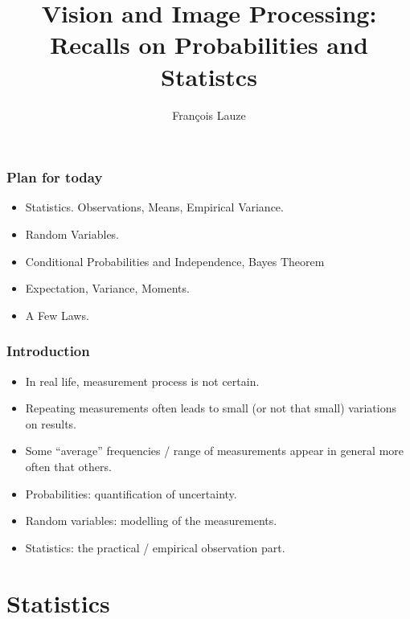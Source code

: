 \documentclass[9pt]{beamer}
\title{Vision and Image Processing:\\ Recalls on Probabilities and Statistcs}
\author[F.~Lauze] %
{Fran{\c c}ois Lauze
}
\institute[DIKU] %
{
  Department of Computer Science\\
  University of Copenhagen
}
\date[2017-18 B2] %
\begin{document}
\maketitle









\begin{frame}
  \frametitle{Plan for today}
  \begin{itemize}
  \item Statistics. Observations, Means, Empirical Variance.
  \item Random Variables.
  \item Conditional Probabilities and Independence, Bayes Theorem
  \item Expectation, Variance, Moments.
  \item A Few Laws.
  \end{itemize}
\end{frame}

\begin{frame}\frametitle{Introduction}
  \begin{itemize}
  \item In real life, measurement process is not certain. 
  \item Repeating measurements often leads to small (or not that small) variations on results.
  \item Some ``average'' frequencies / range of measurements appear in general more often that others.
  \item Probabilities: quantification of uncertainty.
  \item Random variables: modelling of the measurements.
  \item Statistics: the practical / empirical observation part.
  \end{itemize}
\end{frame}


\section{Statistics}
\end{document}
